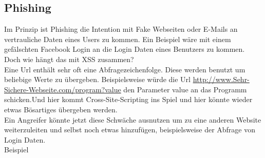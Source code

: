 \subsection{Phishing}
\label{sec:xss_phishing}
Im Prinzip ist Phishing die Intention mit Fake Webseiten oder E-Mails an vertrauliche Daten eines Users zu kommen. Ein Beispiel wäre mit einem gefälschten Facebook Login an die Login Daten eines Benutzers zu kommen. 
\\Doch wie hängt das mit XSS zusammen?\\Eine Url enthält sehr oft eine Abfragezeichenfolge. Diese werden benutzt um beliebige Werte zu übergeben. Beispielsweise würde die Url 
\url{ http://www.Sehr-Sichere-Webseite.com/program?value} den Parameter value an das Programm schicken.Und hier kommt Cross-Site-Scripting ins Spiel und hier könnte wieder etwas Bösartiges übergeben werden.\\Ein Angreifer könnte jetzt diese Schwäche ausnutzen um zu eine anderen Website weiterzuleiten und selbst noch etwas hinzufügen, beispielsweise der Abfrage von Login Daten. \\Beispiel\\
